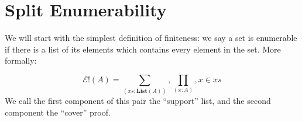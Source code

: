 \section{Split Enumerability} \label{split-enumerable}
We will start with the simplest definition of finiteness: we say a set is
enumerable if there is a list of its elements which contains every element in
the set.
More formally:
\begin{rm-definition}
  \begin{equation}
    \mathcal{E}!(A) = \sum_{(\mathit{xs} : \textbf{List}(A))} , \prod_{(x : A)} , x \in xs
  \end{equation}
  We call the first component of this pair the ``support'' list, and the second
  component the ``cover'' proof.
\end{rm-definition}

